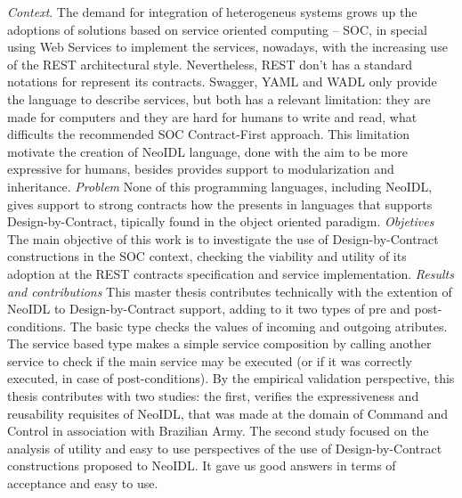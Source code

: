 \emph{Context}. The demand for integration of heterogeneus systems grows up the
adoptions of solutions based on service oriented computing -- SOC, in special
using Web Services to implement the services, nowadays, with the increasing use
of the REST architectural style. Nevertheless, REST don't has a standard
notations for represent its contracts. Swagger, YAML and WADL only provide the
language to describe services, but both has a relevant limitation: they are made
for computers and they are hard for humans to write and read, what difficults the
recommended SOC Contract-First approach. This limitation motivate the creation of NeoIDL
language, done with the aim to be more expressive for humans, besides
provides support to modularization and inheritance. \emph{Problem} None of this programming languages, including NeoIDL, gives support to strong contracts how the
presents in languages that supports Design-by-Contract, tipically found in the
object oriented paradigm. \emph{Objetives} The main objective of this work is to
investigate the use of Design-by-Contract constructions in the SOC context,
checking the viability and utility of its adoption at the REST contracts
specification and service implementation. \emph{Results and contributions} This
master thesis contributes technically with the extention of NeoIDL to
Design-by-Contract support, adding to it two types of pre and post-conditions.
The basic type checks the values of incoming and outgoing atributes. The
service based type makes a simple service composition by calling another service to
check if the main service may be executed (or if it was correctly executed, in case of
post-conditions). By the empirical validation perspective, this thesis
contributes with two studies: the first, verifies the expressiveness and
reusability requisites of NeoIDL, that was made at the domain of Command and
Control in association with Brazilian Army. The second study focused on the
analysis of utility and easy to use perspectives of the use of 
Design-by-Contract constructions proposed to NeoIDL. It gave us good answers in
terms of acceptance and easy to use.
